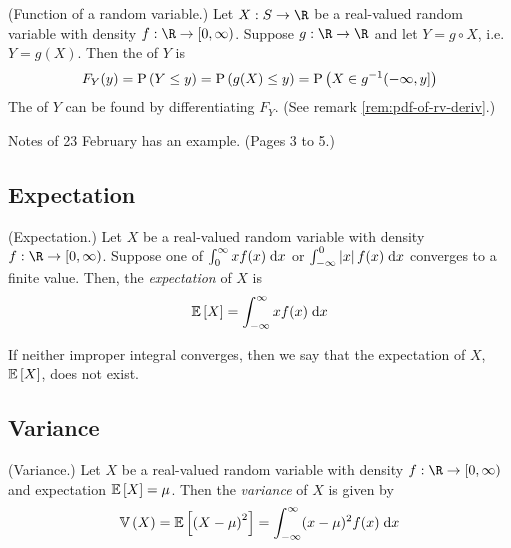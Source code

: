 \documentclass[11pt]{article}
\begin{document}
\begin{rem}{(Function of a random variable.)}
    \label{rem:function-of-cts-rv}
    Let $X : S \to \R$ be a real-valued random variable with density
    $f : \R \to [0, \infty)$.
    Suppose $g : \R \to \R$ and let $Y = g \circ X$, i.e. $Y = g(X)$.
    Then the \cdf{} of $Y$ is
    \begin{equation}
        \label{eq:function-of-cts-rv}
        F_Y (y)
        = \operatorname{P}{\left(Y \leq y\right)}
        = \operatorname{P}{\left(g(X) \leq y\right)}
        = \operatorname{P}{\left(X \in g^{-1}(-\infty, y]\right)}
    \end{equation}
    The \pdf{} of $Y$ can be found by differentiating $F_Y$.
    (See remark \ref{rem:pdf-of-rv-deriv}.)
\end{rem}

Notes of 23 February has an example. (Pages 3 to 5.)

\subsection{Expectation}

\begin{defn}{(Expectation.)}
    \label{def:expectation-cts}
    Let $X$ be a real-valued random variable with density
    $f : \R \to [0, \infty)$.
    Suppose one of
    $\int^{\infty}_0 x f(x) \;\mathrm{d} x$ or $\int_{-\infty}^0 \left\lvert x\right\rvert f(x) \;\mathrm{d} x$
    converges to a finite value.
    Then, the \emph{expectation} of $X$ is
    \begin{equation}
        \label{eq:expectation-cts}
        \operatorname{\mathbb{E}}{\left[X\right]} = \int_{-\infty}^{\infty} x f(x) \;\mathrm{d} x
    \end{equation}

    If neither improper integral converges, then we say that the expectation of
    $X$, $\operatorname{\mathbb{E}}{\left[X\right]}$, does not exist.
\end{defn}

\subsection{Variance}

\begin{defn}{(Variance.)}
    \label{def:variance-cts}
    Let $X$ be a real-valued random variable with density
    $f : \R \to [0, \infty)$ and expectation $\operatorname{\mathbb{E}}{\left[X\right]} = \mu$.
    Then the \emph{variance} of $X$ is given by
    \begin{equation}
        \label{eq:variance-cts}
        \operatorname{\mathbb{V}}{\left(X\right)}
        = \operatorname{\mathbb{E}}{\left[\left(X - \mu\right)^2\right]}
        = \int_{-\infty}^{\infty} (x - \mu)^2 f(x) \;\mathrm{d} x
    \end{equation}
\end{defn}
\end{document}
